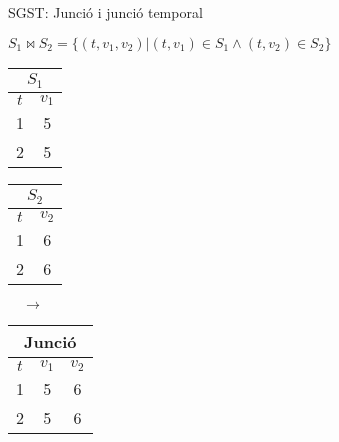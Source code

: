 \begin{frame}{SGST: Junció i junció temporal }
\begin{center}
\begin{definition}[Junció]
 $S_1 \Join S_2 = \{ (t,v_1,v_2) |
  (t,v_1) \in S_1 \wedge (t,v_2) \in S_2  \}$
\end{definition}
{\small
    \begin{tabular}[h]{|c|c|}
    \multicolumn{2}{c}{$S_1$} \\ \hline
      $t$ & $v_1$ \\\hline
      1 & 5 \\
      2 & 5 \\\hline
    \end{tabular}
    \begin{tabular}[h]{|c|c|}
    \multicolumn{2}{c}{$S_2$} \\ \hline
      $t$ & $v_2$ \\\hline
      1 & 6 \\
      2 & 6 \\\hline
    \end{tabular}$\quad\longrightarrow\quad$
    \begin{tabular}[h]{|c|c|c|}
    \multicolumn{3}{c}{Junció} \\ \hline
      $t$ & $v_1$ & $v_2$ \\\hline
      1 & 5 & 6  \\
      2 & 5 & 6\\\hline
    \end{tabular}
}



\end{center}
\end{frame}
